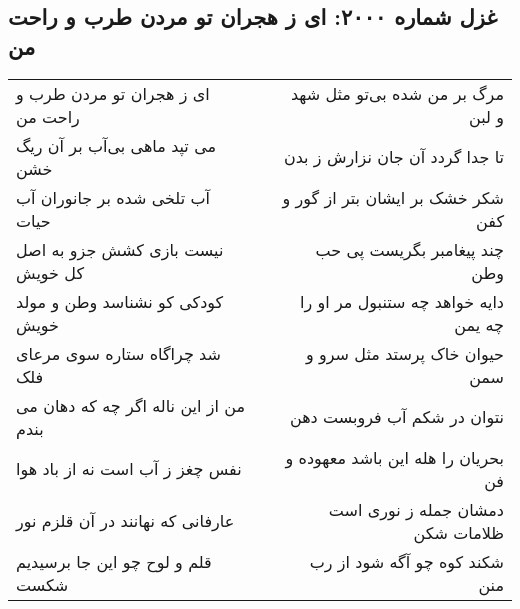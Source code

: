 \begin{center}
\section*{غزل شماره ۲۰۰۰: ای ز هجران تو مردن طرب و راحت من}
\label{sec:2000}
\begin{longtable}{l p{0.5cm} r}
ای ز هجران تو مردن طرب و راحت من
&&
مرگ بر من شده بی‌تو مثل شهد و لبن
\\
می تپد ماهی بی‌آب بر آن ریگ خشن
&&
تا جدا گردد آن جان نزارش ز بدن
\\
آب تلخی شده بر جانوران آب حیات
&&
شکر خشک بر ایشان بتر از گور و کفن
\\
نیست بازی کشش جزو به اصل کل خویش
&&
چند پیغامبر بگریست پی حب وطن
\\
کودکی کو نشناسد وطن و مولد خویش
&&
دایه خواهد چه ستنبول مر او را چه یمن
\\
شد چراگاه ستاره سوی مرعای فلک
&&
حیوان خاک پرستد مثل سرو و سمن
\\
من از این ناله اگر چه که دهان می بندم
&&
نتوان در شکم آب فروبست دهن
\\
نفس چغز ز آب است نه از باد هوا
&&
بحریان را هله این باشد معهوده و فن
\\
عارفانی که نهانند در آن قلزم نور
&&
دمشان جمله ز نوری است ظلامات شکن
\\
قلم و لوح چو این جا برسیدیم شکست
&&
شکند کوه چو آگه شود از رب منن
\\
\end{longtable}
\end{center}
